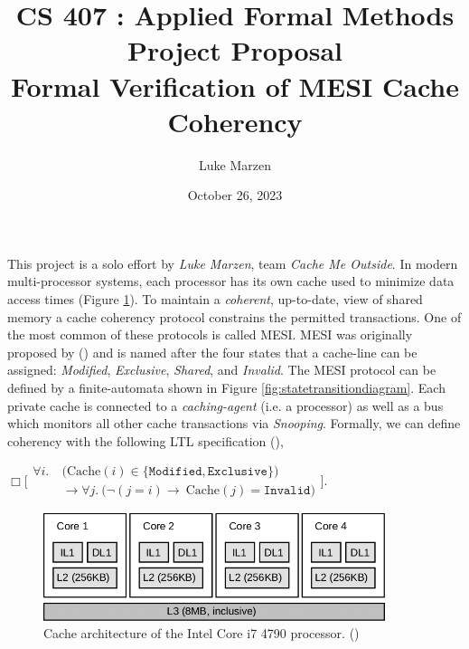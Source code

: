 \documentclass[12pt]{article}
\title{\bf
\large CS 407 : Applied Formal Methods \\
\large Project Proposal \\
\large Formal Verification of MESI Cache Coherency}
\author{Luke Marzen}
\date{October 26, 2023}
\newcommand{\then}{\rightarrow}      %
\newcommand{\Always}{\Box}                   %
\begin{document}
\maketitle

\thispagestyle{empty}


This project is a solo effort by \textit{Luke Marzen}, team \textit{Cache Me Outside}. In modern multi-processor systems, each processor has its own cache used to minimize data access times (Figure \ref{fig:cachediagram}). To maintain a \textit{coherent}, up-to-date, view of shared memory a cache coherency protocol constrains the permitted transactions. One of the most common of these protocols is called MESI. MESI was originally proposed by (\cite{papamarcos1984}) and is named after the four states that a cache-line can be assigned: \textit{Modified}, \textit{Exclusive}, \textit{Shared}, and \textit{Invalid}. The MESI protocol can be defined by a finite-automata shown in Figure \ref{fig:statetransitiondiagram}. Each private cache is connected to a \textit{caching-agent} (i.e. a processor) as well as a bus which monitors all other cache transactions via \textit{Snooping}. Formally, we can define coherency with the following LTL specification (\cite{harrison2010}),

\begin{center}
$\Always \Biggl[
\begin{aligned}
    \forall i.\ &\bigl( \text{Cache}(i) \in \{\texttt{Modified}, \texttt{Exclusive}\} \bigr)\\
    &\then \forall j.\ \bigl( \neg(j = i) \then\ \text{Cache}(j) = \texttt{Invalid} \bigr)
\end{aligned}
\Biggr]$.
\end{center}

\begin{figure}
    \centering
    \includegraphics[width=10cm]{images/Intel-Core-i7-cache-architecture.png}
    \caption{Cache architecture of the Intel Core i7 4790 processor. (\cite{nakamoto2018})}
    \label{fig:cachediagram}
\end{figure}
\end{document}
